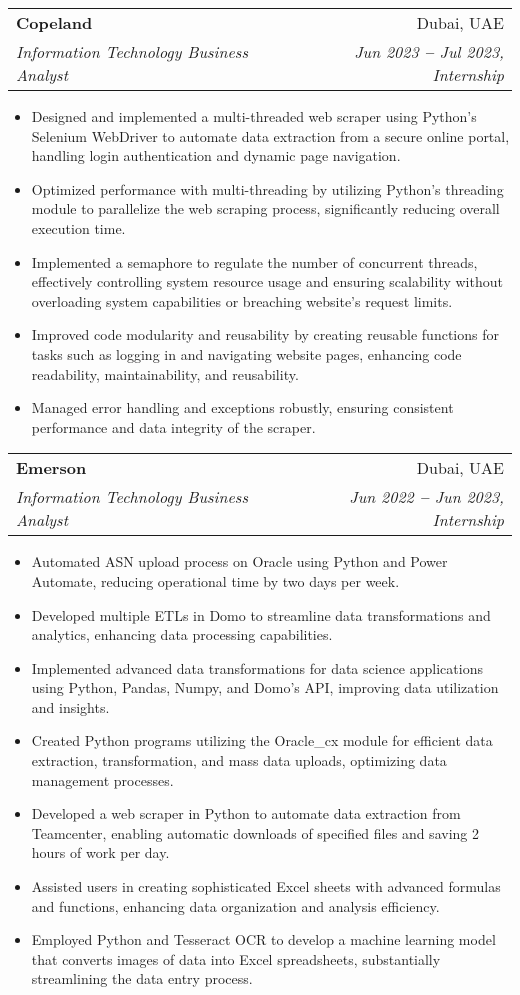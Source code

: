 \documentclass[letterpaper,11pt]{article}
\makeatletter
\newcommand{\resumeItem}[1]{
  \item\small{
    {#1 \vspace{-2pt}}
  }
}
\newcommand{\resumeSubheading}[4]{
  \vspace{-2pt}\item
    \begin{tabular*}{0.97\textwidth}[t]{l@{\extracolsep{\fill}}r}
      \textbf{#1} & #2 \\
      \textit{\small#3} & \textit{\small #4} \\
    \end{tabular*}\vspace{-7pt}
}
\newcommand{\resumeItemListStart}{\begin{itemize}}
\newcommand{\resumeItemListEnd}{\end{itemize}\vspace{-5pt}}
\makeatother
\begin{document}
            \vspace{20pt}
            \resumeSubheading
            {Copeland}{Dubai, UAE}
            {Information Technology Business Analyst}{Jun 2023 \textbf{--} Jul 2023, Internship}
              \resumeItemListStart
                  \resumeItem{Designed and implemented a multi-threaded web scraper using Python's Selenium WebDriver to automate data extraction from a secure online portal, handling login authentication and dynamic page navigation.}
                  \resumeItem{Optimized performance with multi-threading by utilizing Python's threading module to parallelize the web scraping process, significantly reducing overall execution time.}
                  \resumeItem{Implemented a semaphore to regulate the number of concurrent threads, effectively controlling system resource usage and ensuring scalability without overloading system capabilities or breaching website's request limits.}
                  \resumeItem{Improved code modularity and reusability by creating reusable functions for tasks such as logging in and navigating website pages, enhancing code readability, maintainability, and reusability.}
                  \resumeItem{Managed error handling and exceptions robustly, ensuring consistent performance and data integrity of the scraper.}
              \resumeItemListEnd
          

            \vspace{20pt}
            \resumeSubheading
            {Emerson}{Dubai, UAE}
            {Information Technology Business Analyst}{Jun 2022 \textbf{--} Jun 2023, Internship}
              \resumeItemListStart
                  \resumeItem{Automated ASN upload process on Oracle using Python and Power Automate, reducing operational time by two days per week.}
                  \resumeItem{Developed multiple ETLs in Domo to streamline data transformations and analytics, enhancing data processing capabilities.}
                  \resumeItem{Implemented advanced data transformations for data science applications using Python, Pandas, Numpy, and Domo's API, improving data utilization and insights.}
                  \resumeItem{Created Python programs utilizing the Oracle\_cx module for efficient data extraction, transformation, and mass data uploads, optimizing data management processes.}
                  \resumeItem{Developed a web scraper in Python to automate data extraction from Teamcenter, enabling automatic downloads of specified files and saving 2 hours of work per day.}
                  \resumeItem{Assisted users in creating sophisticated Excel sheets with advanced formulas and functions, enhancing data organization and analysis efficiency.}
                  \resumeItem{Employed Python and Tesseract OCR to develop a machine learning model that converts images of data into Excel spreadsheets, substantially streamlining the data entry process.}
              \resumeItemListEnd
\end{document}

